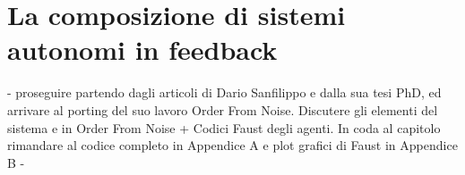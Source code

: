\section{La composizione di sistemi autonomi in feedback}
\label{sec:La composizione di sistemi autonomi in feedback}

- proseguire partendo dagli articoli di Dario Sanfilippo e dalla sua tesi PhD,
ed arrivare al porting del suo lavoro Order From Noise.
Discutere gli elementi del sistema e in Order From Noise +
Codici Faust degli agenti.
In coda al capitolo rimandare al codice completo in Appendice A e plot
grafici di Faust in Appendice B -
